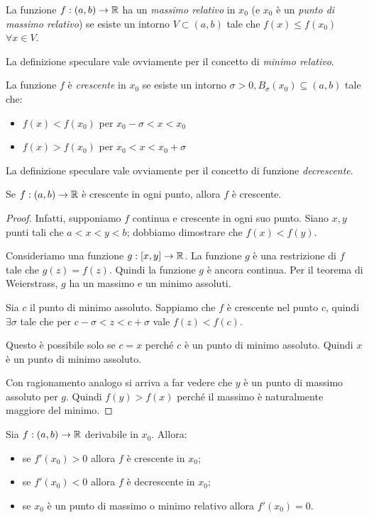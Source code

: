\begin{definition}
La funzione $f: (a,b) \to \mathbb R$ ha un \emph{massimo relativo} in $x_0$ (e $x_0$ è un \emph{punto di massimo relativo}) se esiste un intorno $V \subset (a,b)$ tale che $f(x) \le f(x_0)$ $\forall x \in V$.
\end{definition}

La definizione speculare vale ovviamente per il concetto di \emph{minimo relativo}.

\begin{definition}
La funzione $f$ è \emph{crescente} in $x_0$ se esiste un intorno $\sigma > 0, B_\sigma (x_0) \subseteq (a,b)$ tale che:
\begin{itemize}
\item $f(x) < f(x_0)$ per $x_0 - \sigma < x < x_0$
\item $f(x) > f(x_0)$ per $x_0 < x < x_0 + \sigma$
\end{itemize}
\end{definition}

La definizione speculare vale ovviamente per il concetto di funzione \emph{decrescente}.

\begin{remark}
Se $f: (a,b) \to \mathbb R$ è crescente in ogni punto, allora $f$ è crescente.
\end{remark}

\begin{proof}
Infatti, supponiamo $f$ continua e crescente in ogni suo punto. Siano $x, y$ punti tali che $a < x < y < b$; dobbiamo dimostrare che $f(x) < f(y)$.

Consideriamo una funzione $g: [x, y] \to \mathbb R$. La funzione $g$ è una restrizione di $f$ tale che $g(z) = f(z)$. Quindi la funzione $g$ è ancora continua. Per il teorema di Weierstrass, $g$ ha un massimo e un minimo assoluti.

Sia $c$ il punto di minimo assoluto. Sappiamo che $f$ è crescente nel punto $c$, quindi $\exists \sigma$ tale che per $c - \sigma < z < c + \sigma$ vale $f(z) < f(c)$.

Questo è possibile solo se $c = x$ perché $c$ è un punto di minimo assoluto. Quindi $x$ è un punto di minimo assoluto.

Con ragionamento analogo si arriva a far vedere che $y$ è un punto di massimo assoluto per $g$. Quindi $f(y) > f(x)$ perché il massimo è naturalmente maggiore del minimo.
\end{proof}

\begin{theorem}
Sia $f: (a,b) \to \mathbb R$ derivabile in $x_0$. Allora:
\begin{itemize}
\item se $f'(x_0) > 0$ allora $f$ è crescente in $x_0$;
\item se $f'(x_0) < 0$ allora $f$ è decrescente in $x_0$;
\item se $x_0$ è un punto di massimo o minimo relativo allora $f'(x_0)=0$.
\end{itemize}
\end{theorem}

